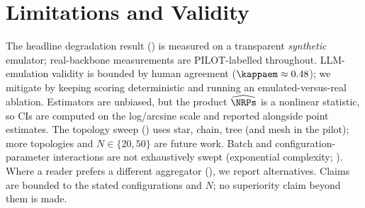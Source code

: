 \section{Limitations and Validity}
\label{sec:limitations}

The headline degradation result () is measured on a transparent
\emph{synthetic} emulator; real-backbone measurements are PILOT-labelled throughout.
LLM-emulation validity is bounded by human agreement
($\kappaem\approx0.48$); we mitigate by keeping scoring deterministic and running an
emulated-versus-real ablation. Estimators are unbiased, but the product
$\widehat{\NRPs}$ is a nonlinear statistic, so CIs are computed on the log/arcsine
scale and reported alongside point estimates. The topology sweep
() uses star, chain, tree (and mesh in the pilot); more topologies
and $N\in\{20,50\}$ are future work. Batch and configuration-parameter interactions are
not exhaustively swept (exponential complexity; ). Where a reader
prefers a different aggregator (), we report alternatives. Claims are
bounded to the stated configurations and $N$; no superiority claim beyond them is made.